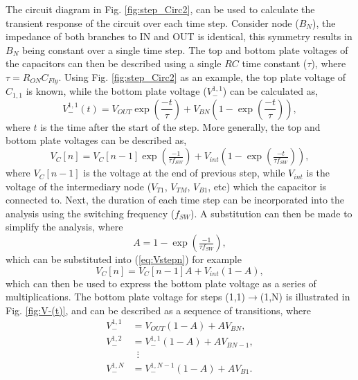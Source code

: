 \documentclass[conference]{IEEEtran}
\begin{document}
	The circuit diagram in Fig. \ref{fig:step_Circ2}, can be used to calculate the transient response of the circuit over each time step. Consider node ($B_N$),  the impedance of both branches to IN and OUT is identical, this symmetry results in $B_N$ being constant over a single time step. The top and bottom plate voltages of the capacitors can then be described using a single $RC$ time constant ($\tau$), where $\tau = R_{ON}C_{Fly}$. Using Fig. \ref{fig:step_Circ2} as an example, the top plate voltage of $C_{1,1}$ is known, while the bottom plate voltage ($V_{-}^{1,1}$) can be calculated as,
	\begin{equation}
	V_{-}^{1,1}(t) = V_{OUT}\exp\left(\frac{-t}{\tau}\right) + V_{BN}\left(1-\exp\left(\frac{-t}{\tau}\right)\right),
	\end{equation}
	where $t$ is the time after the start of the step. More generally, the top and bottom plate voltages can be described as,
	\begin{equation}
	V_{C}[n]\! =\! V_{C}[n\!-\!1]\exp\left(\tfrac{-1}{\tau f_{SW}}\right) + V_{int}\!\left(1-\exp\left(\tfrac{-t}{\tau f_{SW}}\right)\right),
	\label{eq:Vstepn}
	\end{equation}
	where $V_{C}[n-1]$ is the voltage at the end of previous step, while $V_{int}$ is the voltage of the intermediary node ($V_{T1}$, $V_{TM}$, $V_{B1}$, etc) which the capacitor is connected to. Next, the duration of each time step can be incorporated into the analysis using the switching frequency ($f_{SW}$). A substitution can then be made to simplify the analysis, where
	\begin{equation}
	A = 1-\exp\left(\tfrac{-1}{\tau f_{SW}}\right),
	\label{eq:A}
	\end{equation}
	which can be substituted into (\ref{eq:Vstepn}) for example
	\begin{equation}
		V_{C}[n] = V_C[n-1]A + V_{int}(1-A),
	\end{equation}
	which can then be used to express the bottom plate voltage as a series of multiplications. The bottom plate voltage for steps (1,1)$\rightarrow $(1,N) is illustrated in Fig. \ref{fig:V-(t)}, and can be described as a sequence of transitions, where
	\begin{equation}
	\begin{split}
	V_-^{1,1} &= V_{OUT}(1-A) + AV_{BN},\\
	V_-^{1,2} &= V_-^{1,1}(1-A) + AV_{BN-1},\\
	& \,\,\,\vdots\\
	V_{-}^{1,N} &= V_-^{1,N-1}(1-A) + AV_{B1}.
	\end{split}		
	\end{equation}
\end{document}
